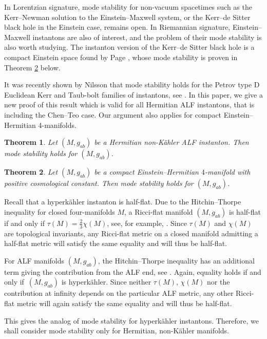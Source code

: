 \documentclass[pdftex]{sigma}
\numberwithin{equation}{section}
\newtheorem{Theorem}{Theorem}[section]
\begin{document}
\begin{Remark}
In Lorentzian signature, mode stability for non-vacuum spacetimes such as the Kerr--Newman solution to the Einstein--Maxwell system, or the Kerr--de Sitter black hole in the Einstein case, remains open. In Riemannian signature, Einstein--Maxwell instantons are also of interest, and the problem of their mode stability is also worth studying. The instanton version of the Kerr--de Sitter black hole is a compact Einstein space found by Page \cite{Page}, whose mode stability is proven in Theorem \ref{thm:modestabCompact} below.
\end{Remark}

It was recently shown by Nilsson that mode stability holds for the Petrov type D Euclidean Kerr and Taub-bolt families of instantons, see \cite{2024CQGra..41h5004N}. In this paper, we give a new proof of this result which is valid for all Hermitian ALF instantons, that is including the Chen--Teo case.
Our argument also applies for compact Einstein--Hermitian 4-manifolds.

\begin{Theorem}
\label{thm:modestab}
Let $(M,g_{ab})$ be a Hermitian non-K\"ahler ALF instanton. Then mode stability holds for $(M,g_{ab})$.
\end{Theorem}

\begin{Theorem} \label{thm:modestabCompact}
Let $(M,g_{ab})$ be a compact Einstein--Hermitian $4$-manifold with positive cosmological constant. Then mode stability holds for $(M,g_{ab})$.
\end{Theorem}

\begin{Remark}\label{remark:halfflat}
Recall that a hyperk\"ahler instanton is half-flat. Due to the Hitchin--Thorpe inequality for closed four-manifolds $M$, a Ricci-flat manifold $(M,g_{ab})$ is half-flat if and only if $\tau(M)=\frac{2}{3}\chi(M)$, see, for example, \cite[Section~13.8]{MR2371700}. Since $\tau(M)$ and $\chi(M)$ are topological invariants, any Ricci-flat metric on a closed manifold admitting a half-flat metric will satisfy the same equality and will thus be half-flat.

For ALF manifolds $(M,g_{ab})$, the Hitchin--Thorpe inequality has an additional term giving the contribution from the ALF end, see \cite{Chen-Li21,Dai-Wei07}. Again, equality holds if and only if~$(M,g_{ab})$ is hyperk\"ahler. Since neither $\tau(M)$, $\chi(M)$ nor the contribution at infinity depends on the particular ALF metric, any other Ricci-flat metric will again satisfy the same equality and will thus be half-flat.

This gives the analog of mode stability for hyperk\"ahler instantons. Therefore, we shall consider mode stability only for Hermitian, non-K\"ahler manifolds.
\end{Remark}
\end{document}
